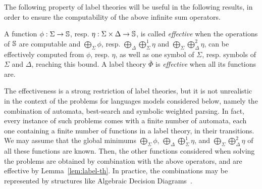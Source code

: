 



\noindent 
The following property of label theories will be useful in 
the following results, in order to ensure 
the computability of the above infinite sum operators.
%
\begin{definition}\label{def:effective}
A function $\phi: \Sigma \to \mathbb{S}$, 
resp. $\eta: \Sigma \times \Delta \to \mathbb{S}$,
is called \emph{effective} when 
the operations of $\mathbb{S}$ are computable and
$\bigoplus_{\Sigma} \phi$,
resp. $\bigoplus_{\Delta}\bigoplus^1_{\Sigma} \eta$ and $\bigoplus_{\Sigma}\bigoplus^2_{\Delta} \eta$,
can be effectively computed from $\phi$, resp. $\eta$, 
as well as one symbol of $\Sigma$, resp. symbols of $\Sigma$ and $\Delta$, 
reaching this bound.
%
A label theory $\bar\Phi$ is \emph{effective} when all its functions are.
\end{definition}

The effectiveness is a strong restriction of label theories, but it is
not unrealistic in the context of the problems for languages models considered below, 
namely the combination of automata, best-search and symbolic weighted parsing.
%
In fact, every instance of such problems comes with a finite number of automata, 
each one containing a finite number of functions in a label theory, in their transitions. 
We may assume that the global minimums $\bigoplus_{\Sigma} \phi$,
$\bigoplus_{\Delta}\bigoplus^1_{\Sigma} \eta$, and
$\bigoplus_{\Sigma}\bigoplus^2_{\Delta} \eta$
of all these functions are known.
%
Then, the other functions considered when solving the problems are obtained by combination with the above operators, and are effective by Lemma~\ref{lem:label-th}.
In practice, the combinations may be represented by structures like 
Algebraic Decision Diagrams~\cite{Bahar97ADD}.



